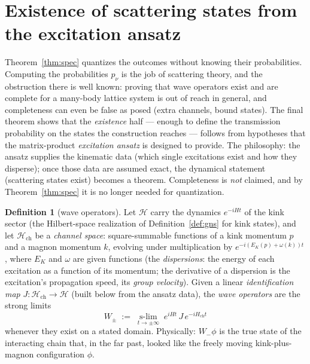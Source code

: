 \documentclass[11pt]{article}
\theoremstyle{definition}
\newtheorem{definition}[theorem]{Definition}
\theoremstyle{remark}
\newcommand{\Hs}{\mathcal{H}}
\newcommand{\slim}{\operatorname*{s-lim}}
\begin{document}
\section{Existence of scattering states from the excitation ansatz}
\label{sec:acex}

Theorem~\ref{thm:spec} quantizes the outcomes without knowing their
probabilities.  Computing the probabilities $p_\nu$ is the job of scattering
theory, and the obstruction there is well known: proving that wave operators
exist and are complete for a many-body lattice system is out of reach in
general, and completeness can even be false as posed (extra channels, bound
states).  The final theorem shows that the \emph{existence} half --- enough
to define the transmission probability on the states the construction
reaches --- follows from hypotheses that the matrix-product
\emph{excitation ansatz} \cite{haegeman2011,haegeman2013,vanderstraeten2019}
is designed to provide.  The philosophy: the ansatz supplies the kinematic
data (which single excitations exist and how they disperse); once those data
are assumed exact, the dynamical statement (scattering states exist) becomes
a theorem.  Completeness is \emph{not} claimed, and by
Theorem~\ref{thm:spec} it is no longer needed for quantization.

\begin{definition}[wave operators]\label{def:wave}
Let $\Hs$ carry the dynamics $e^{-iHt}$ of the kink sector (the
Hilbert-space realization of Definition~\ref{def:gns} for kink states), and
let $\Hs_{\mathrm{ch}}$ be a \emph{channel space}: square-summable functions
of a kink momentum $p$ and a magnon momentum $k$, evolving under
multiplication by $e^{-i(E_K(p)+\omega(k))t}$, where $E_K$ and $\omega$ are
given functions (the \emph{dispersions}: the energy of each excitation as a
function of its momentum; the derivative of a dispersion is the excitation's
propagation speed, its \emph{group velocity}).  Given a linear \emph{identification
map} $J:\Hs_{\mathrm{ch}}\to\Hs$ (built below from the ansatz data), the
\emph{wave operators} are the strong limits
\[
W_\pm\;:=\;\slim_{t\to\pm\infty}\;e^{iHt}\,J\,e^{-iH_{\mathrm{ch}}t}
\]
whenever they exist on a stated domain.  Physically: $W_-\phi$ is the true
state of the interacting chain that, in the far past, looked like the freely
moving kink-plus-magnon configuration $\phi$.
\end{definition}
\end{document}
